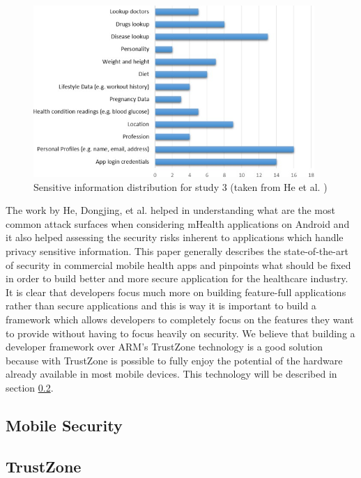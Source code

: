 \begin{figure}[t!]
  \centering
  \includegraphics[width=0.95\textwidth]{img/sensitivedistribution.jpg}
  \caption{Sensitive information distribution for study 3 (taken from  He et al. \cite{he2014security})}
  \label{fig:sensitivedistribution}
\end{figure}

The work by He, Dongjing, et al. \cite{he2014security} helped in understanding what are the most common attack surfaces when considering mHealth applications on Android and it also helped assessing the security risks inherent to applications which handle privacy sensitive information. This paper generally describes the state-of-the-art of security in commercial mobile health apps and pinpoints what should be fixed in order to build better and more secure application for the healthcare industry. It is clear that developers focus much more on building feature-full applications rather than secure applications and this is way it is important to build a framework which allows developers to completely focus on the features they want to provide without having to focus heavily on security. We believe that building a developer framework over ARM's TrustZone technology is a good solution because with TrustZone is possible to fully enjoy the potential of the hardware already available in most mobile devices. This technology will be described in section \ref{sec:trustzone}. 

\subsection{Mobile Security}
%
%
\subsection{TrustZone}
\label{sec:trustzone}
%
%

